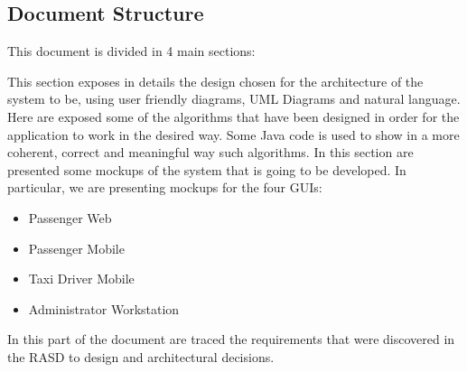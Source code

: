 \subsection{Document Structure}
This document is divided in 4 main sections:
\begin{itemize}
	 This section exposes in details the design chosen for the architecture of the system to be, using user friendly diagrams, UML Diagrams and natural language.
	 Here are exposed some of the algorithms that have been designed in order for the application to work in the desired way. Some Java code is used to show in a more coherent, correct and meaningful way such algorithms.
	 In this section are presented some mockups of the system that is going to be developed. In particular, we are presenting mockups for the four GUIs:
	\begin{itemize}
		\item Passenger Web
		\item Passenger Mobile
		\item Taxi Driver Mobile
		\item Administrator Workstation
	\end{itemize}
	 In this part of the document are traced the requirements that were discovered in the RASD to design and architectural decisions.
\end{itemize}